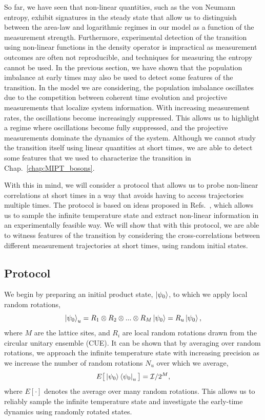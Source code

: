 So far, we have seen that non-linear quantities, such as the von Neumann entropy, exhibit signatures in the steady state that allow us to distinguish between the area-law and logarithmic regimes in our model as a function of the measurement strength. Furthermore, experimental detection of the transition using non-linear functions in the density operator is impractical as measurement outcomes are often not reproducible, and techniques for measuring the entropy cannot be used. In the previous section, we have shown that the population imbalance at early times may also be used to detect some features of the transition. In the model we are considering, the population imbalance oscillates due to the competition between coherent time evolution and projective measurements that localize system information. With increasing measurement rates, the oscillations become increasingly suppressed. This allows us to highlight a regime where oscillations become fully suppressed, and the projective measurements dominate the dynamics of the system. Although we cannot study the transition itself using linear quantities at short times, we are able to detect some features that we used to characterize the transition in Chap.~\ref{chap:MIPT_bosons}. 

With this in mind, we will consider a protocol that allows us to probe non-linear correlations at short times in a way that avoids having to access trajectories multiple times. The protocol is based on ideas proposed in Refs.~\cite{elben2018,vermersch2018, vermersch2019}, which allows us to sample the infinite temperature state and extract non-linear information in an experimentally feasible way. We will show that with this protocol, we are able to witness features of the transition by considering the cross-correlations between different measurement trajectories at short times, using random initial states.

\subsection{Protocol}

We begin by preparing an initial product state, $\ket{\psi_0}$, to which we apply local random rotations, 
\begin{equation}
\label{eq:Ru}
    \ket{\psi_0}_u = R_1 \otimes R_2 \otimes ... \otimes R_M \ket{\psi_0} = R_u \ket{\psi_0},
\end{equation}
where $M$ are the lattice sites, and $R_i$ are local random rotations drawn from the circular unitary ensemble (CUE). It can be shown that by averaging over random rotations, we approach the infinite temperature state with increasing precision as we increase the number of random rotations $N_u$ over which we average,
\begin{equation}
    E\big[\ket{\psi_0}\bra{\psi_0}_u\big] = \mathcal{I}/2^M,
\end{equation}
where $E[\cdot]$ denotes the average over many random rotations. This allows us to reliably sample the infinite temperature state and investigate the early-time dynamics using randomly rotated states. 

